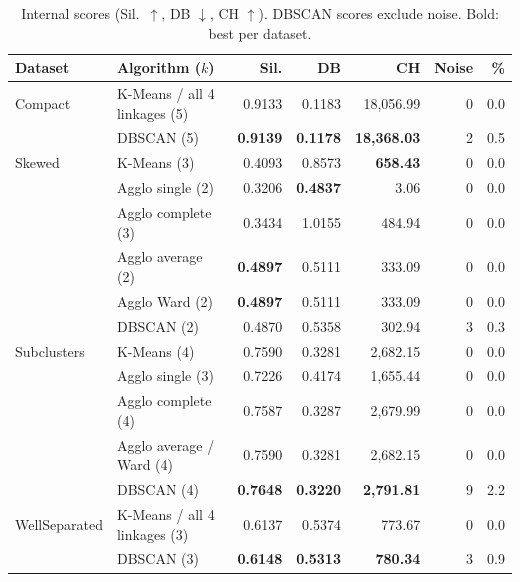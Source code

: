 \documentclass[11pt]{article}
\begin{document}
\begin{table}[H]\centering\small
\caption{Internal scores (Sil.\ $\uparrow$, DB $\downarrow$, CH $\uparrow$). DBSCAN scores exclude noise. Bold: best per dataset.}\label{tab:scores}
\begin{tabular}{@{}llrrrrr@{}}\toprule
Dataset & Algorithm ($k$) & Sil. & DB & CH & Noise & \%\\\midrule
Compact & K-Means / all 4 linkages (5) & 0.9133 & 0.1183 & 18{,}056.99 & 0 & 0.0\\
 & DBSCAN (5) & \textbf{0.9139} & \textbf{0.1178} & \textbf{18{,}368.03} & 2 & 0.5\\\midrule
Skewed & K-Means (3) & 0.4093 & 0.8573 & \textbf{658.43} & 0 & 0.0\\
 & Agglo single (2) & 0.3206 & \textbf{0.4837} & 3.06 & 0 & 0.0\\
 & Agglo complete (3) & 0.3434 & 1.0155 & 484.94 & 0 & 0.0\\
 & Agglo average (2) & \textbf{0.4897} & 0.5111 & 333.09 & 0 & 0.0\\
 & Agglo Ward (2) & \textbf{0.4897} & 0.5111 & 333.09 & 0 & 0.0\\
 & DBSCAN (2) & 0.4870 & 0.5358 & 302.94 & 3 & 0.3\\\midrule
Subclusters & K-Means (4) & 0.7590 & 0.3281 & 2{,}682.15 & 0 & 0.0\\
 & Agglo single (3) & 0.7226 & 0.4174 & 1{,}655.44 & 0 & 0.0\\
 & Agglo complete (4) & 0.7587 & 0.3287 & 2{,}679.99 & 0 & 0.0\\
 & Agglo average / Ward (4) & 0.7590 & 0.3281 & 2{,}682.15 & 0 & 0.0\\
 & DBSCAN (4) & \textbf{0.7648} & \textbf{0.3220} & \textbf{2{,}791.81} & 9 & 2.2\\\midrule
WellSeparated & K-Means / all 4 linkages (3) & 0.6137 & 0.5374 & 773.67 & 0 & 0.0\\
 & DBSCAN (3) & \textbf{0.6148} & \textbf{0.5313} & \textbf{780.34} & 3 & 0.9\\\bottomrule
\end{tabular}\end{table}
\end{document}
